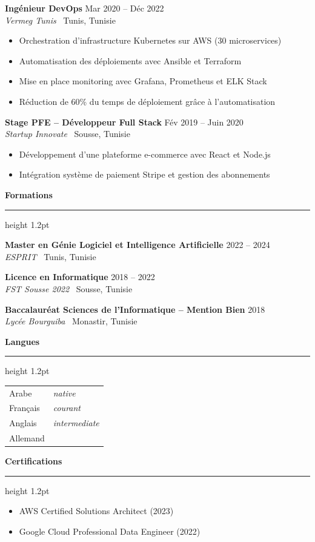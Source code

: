 \documentclass[10pt,a4paper]{article}
\newcommand{\cvsection}[1]{%
    \vspace{6pt}%
    {\color{primary}\large\bfseries #1}%
    \vspace{1pt}%
    {\color{primary}\hrule height 1.2pt}%
    \vspace{4pt}%
}
\newcommand{\cventry}[4]{%
    \textbf{#1} \hfill \textcolor{secondary}{\small #2}\\%
    \textit{\textcolor{secondary}{#3}} \hfill \textcolor{secondary}{\small\faMapMarker*\ #4}%
    \vspace{1pt}%
}
\begin{document}
\vspace{5pt}
\cventry{Ingénieur DevOps}{Mar 2020 -- Déc 2022}{Vermeg Tunis}{Tunis, Tunisie}
\begin{itemize}[leftmargin=1.2em, itemsep=0pt, topsep=2pt]
    \item Orchestration d'infrastructure Kubernetes sur AWS (30 microservices)
    \item Automatisation des déploiements avec Ansible et Terraform
    \item Mise en place monitoring avec Grafana, Prometheus et ELK Stack
    \item Réduction de 60\% du temps de déploiement grâce à l'automatisation
\end{itemize}

\vspace{5pt}
\cventry{Stage PFE -- Développeur Full Stack}{Fév 2019 -- Juin 2020}{Startup Innovate}{Sousse, Tunisie}
\begin{itemize}[leftmargin=1.2em, itemsep=0pt, topsep=2pt]
    \item Développement d'une plateforme e-commerce avec React et Node.js
    \item Intégration système de paiement Stripe et gestion des abonnements
\end{itemize}

\cvsection{Formations}

\cventry{Master en Génie Logiciel et Intelligence Artificielle}{2022 -- 2024}{ESPRIT}{Tunis, Tunisie}

\vspace{5pt}
\cventry{Licence en Informatique}{2018 -- 2022}{FST Sousse 2022}{Sousse, Tunisie}

\vspace{5pt}
\cventry{Baccalauréat Sciences de l'Informatique -- Mention Bien}{2018}{Lycée Bourguiba}{Monastir, Tunisie}

\vspace{4pt}
\begin{minipage}[t]{0.48\textwidth}
\cvsection{Langues}
\begin{tabular}{@{}ll}
    Arabe   & \textit{native} \\
    Français & \textit{courant} \\
    Anglais  & \textit{intermediate} \\
    Allemand & \\
\end{tabular}
\end{minipage}
\hfill
\begin{minipage}[t]{0.48\textwidth}
\cvsection{Certifications}
\begin{itemize}[leftmargin=1.2em, itemsep=2pt]
    \item AWS Certified Solutions Architect (2023)
    \item Google Cloud Professional Data Engineer (2022)
\end{itemize}
\end{minipage}
\end{document}
